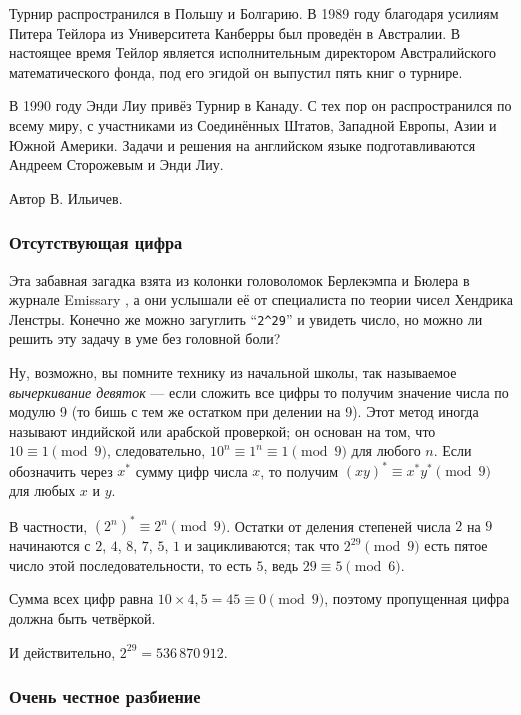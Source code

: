 Турнир распространился в Польшу и Болгарию.
В 1989 году благодаря усилиям Питера Тейлора из Университета Канберры был проведён в Австралии.
В настоящее время Тейлор является исполнительным директором Австралийского математического фонда, под его эгидой он выпустил пять книг о турнире.

В 1990 году Энди Лиу привёз Турнир в Канаду.
С тех пор он распространился по всему миру, с участниками из Соединённых Штатов, Западной Европы, Азии и Южной Америки.
Задачи и решения на английском языке подготавливаются Андреем Сторожевым и Энди Лиу.

\begin{addedbytheeditors}
Автор В. Ильичев.\pr

\end{addedbytheeditors}

\subsubsection*{Отсутствующая цифра}

Эта забавная загадка взята из колонки головоломок Берлекэмпа и Бюлера в журнале Emissary \cite[весна/осень 2006 года]{3},
а они услышали её от специалиста по теории чисел Хендрика Ленстры.
Конечно же можно загуглить ``\texttt{2\^{}29}'' и увидеть число, но можно ли решить эту задачу в уме без головной боли?

Ну, возможно, вы помните технику из начальной школы, так называемое \emph{вычеркивание девяток} --- если сложить все цифры то получим значение числа по модулю 9 (то бишь с тем же остатком при делении на 9).
Этот метод иногда называют индийской или арабской проверкой;
он основан на том, что $10 \equiv 1 \pmod 9$, следовательно, $10^n \equiv 1^n \equiv 1 \pmod 9$ для любого $n$.
Если обозначить через $x^*$ сумму цифр числа $x$, то получим $(xy)^* \equiv x^* y^* \pmod 9$ для любых $x$ и $y$.

В частности, $(2^n)^* \equiv 2^n \pmod 9$.
Остатки от деления степеней числа $2$ на $9$ начинаются с $2$, $4$, $8$, $7$, $5$, $1$ и зацикливаются;
так что $2^{29} \pmod 9$ есть пятое число этой последовательности, то есть $5$, ведь $29 \equiv 5 \pmod 6$.

Сумма всех цифр равна $10 \times 4{,}5 = 45 \equiv 0 \pmod 9$, поэтому пропущенная цифра должна быть четвёркой.

И действительно, $2^{29} = 536\,870\,912$.

\subsubsection*{Очень честное разбиение}

